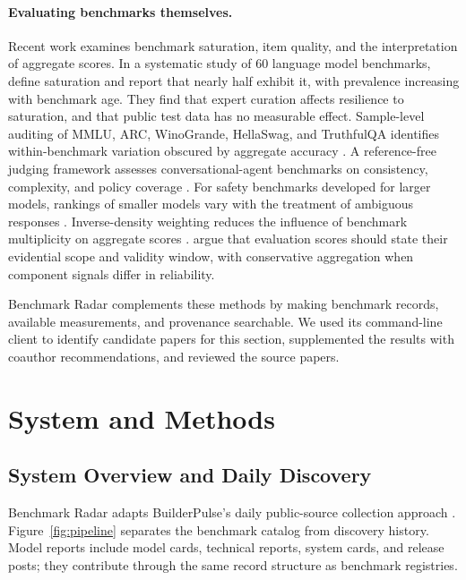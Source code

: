 \documentclass[11pt]{article}
\begin{document}
\paragraph{Evaluating benchmarks themselves.}
Recent work examines benchmark saturation, item quality, and the interpretation of aggregate scores. In a systematic study of 60 language model benchmarks, \citet{akhtar2026plateau} define saturation and report that nearly half exhibit it, with prevalence increasing with benchmark age. They find that expert curation affects resilience to saturation, and that public test data has no measurable effect. Sample-level auditing of MMLU, ARC, WinoGrande, HellaSwag, and TruthfulQA identifies within-benchmark variation obscured by aggregate accuracy \citep{siedler2026benchmarks}. A reference-free judging framework assesses conversational-agent benchmarks on consistency, complexity, and policy coverage \citep{koren2026benchmarking}. For safety benchmarks developed for larger models, rankings of smaller models vary with the treatment of ambiguous responses \citep{shaik2026benchmarking}. Inverse-density weighting reduces the influence of benchmark multiplicity on aggregate scores \citep{lin2026balance}. \citet{gilda2026position} argue that evaluation scores should state their evidential scope and validity window, with conservative aggregation when component signals differ in reliability.

Benchmark Radar complements these methods by making benchmark records, available measurements, and provenance searchable. We used its command-line client to identify candidate papers for this section, supplemented the results with coauthor recommendations, and reviewed the source papers.

\section{System and Methods}

\subsection{System Overview and Daily Discovery}

Benchmark Radar adapts BuilderPulse's daily public-source collection approach \citep{builderpulse}. Figure~\ref{fig:pipeline} separates the benchmark catalog from discovery history. Model reports include model cards, technical reports, system cards, and release posts; they contribute through the same record structure as benchmark registries.
\end{document}

